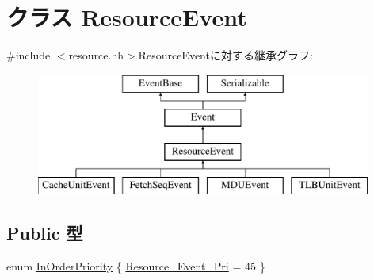 \hypertarget{classResourceEvent}{
\section{クラス ResourceEvent}
\label{classResourceEvent}
}


{\ttfamily \#include $<$resource.hh$>$}ResourceEventに対する継承グラフ:\begin{figure}[H]
\begin{center}
\leavevmode
\includegraphics[height=4cm]{classResourceEvent}
\end{center}
\end{figure}
\subsection*{Public 型}
\begin{DoxyCompactItemize}
\item 
enum \hyperlink{classResourceEvent_adbb7cf3320b352f9d5ac0d9d551b1d51}{InOrderPriority} \{ \hyperlink{classResourceEvent_adbb7cf3320b352f9d5ac0d9d551b1d51a2799452f4eb3f1d208cfc92786e7fbdf}{Resource\_\-Event\_\-Pri} =  45
 \}
\end{DoxyCompactItemize}
